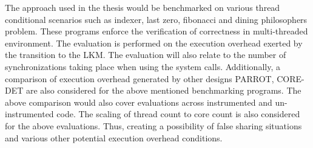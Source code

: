 The approach used in the thesis would be benchmarked on various thread conditional scenarios such as indexer, last zero, fibonacci and dining philosophers problem. 
These programs enforce the verification of correctness in multi-threaded environment. 
The evaluation is performed on the execution overhead exerted by the transition to the LKM. 
The evaluation will also relate to the number of synchronizations taking place when using the system calls. 
Additionally, a comparison of execution overhead generated by other designs PARROT, CORE-DET are also considered for the above mentioned benchmarking programs. 
The above comparison would also cover evaluations across instrumented and un-instrumented code. 
The scaling of thread count to core count is also considered for the above evaluations.
Thus, creating a possibility of false sharing situations and various other potential execution overhead conditions. 
